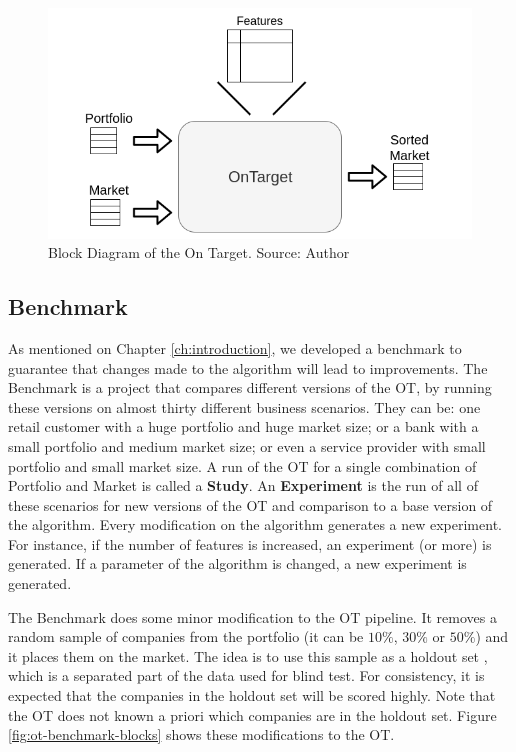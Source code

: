 \begin{figure}[h]
   \centering
   \includegraphics[width=\linewidth]{fig/ch3-ot-blocks.png}
   \caption{Block Diagram of the On Target. Source: Author}
   \label{fig:ot-blocks}
\end{figure}

\subsection{Benchmark}

As mentioned on Chapter \ref{ch:introduction}, we developed a benchmark to guarantee that changes made to the algorithm will lead to improvements. The Benchmark is a project that compares different versions of the OT, by running these versions on almost thirty different business scenarios. They can be: one retail customer with a huge portfolio and huge market size; or a bank with a small portfolio and medium market size; or even a service provider with small portfolio and small market size. A run of the OT for a single combination of Portfolio and Market is called a \textbf{Study}. An \textbf{Experiment} is the run of all of these scenarios for new versions of the OT and comparison to a base version of the algorithm. Every modification on the algorithm generates a new experiment. For instance, if the number of features is increased, an experiment (or more) is generated. If a parameter of the algorithm is changed, a new experiment is generated.

The Benchmark does some minor modification to the OT pipeline. It removes a random sample of companies from the portfolio (it can be $10\%$, $30\%$ or $50\%$) and it places them on the market. The idea is to use this sample as a holdout set \cite{kohavi2001}, which is a separated part of the data used for blind test. For consistency, it is expected that the companies in the holdout set will be scored highly. Note that the OT does not known a priori which companies are in the holdout set. Figure \ref{fig:ot-benchmark-blocks} shows these modifications to the OT.


